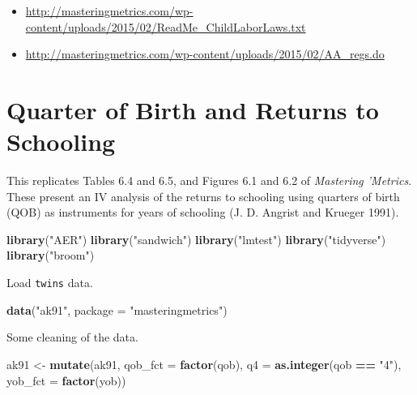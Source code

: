 \documentclass[]{book}
\newenvironment{Shaded}{\begin{snugshade}}{\end{snugshade}}
\newcommand{\KeywordTok}[1]{\textcolor[rgb]{0.13,0.29,0.53}{\textbf{#1}}}
\newcommand{\DataTypeTok}[1]{\textcolor[rgb]{0.13,0.29,0.53}{#1}}
\newcommand{\StringTok}[1]{\textcolor[rgb]{0.31,0.60,0.02}{#1}}
\newcommand{\OperatorTok}[1]{\textcolor[rgb]{0.81,0.36,0.00}{\textbf{#1}}}
\newcommand{\NormalTok}[1]{#1}
\providecommand{\tightlist}{%
  \setlength{\itemsep}{0pt}\setlength{\parskip}{0pt}}
\theoremstyle{definition}
\theoremstyle{definition}
\theoremstyle{definition}
\theoremstyle{remark}
\begin{document}
\begin{itemize}
\tightlist
\item
  \url{http://masteringmetrics.com/wp-content/uploads/2015/02/ReadMe_ChildLaborLaws.txt}
\item
  \url{http://masteringmetrics.com/wp-content/uploads/2015/02/AA_regs.do}
\end{itemize}

\chapter{Quarter of Birth and Returns to
Schooling}\label{quarter-of-birth-and-returns-to-schooling}

This replicates Tables 6.4 and 6.5, and Figures 6.1 and 6.2 of
\emph{Mastering 'Metrics}. These present an IV analysis of the returns
to schooling using quarters of birth (QOB) as instruments for years of
schooling (J. D. Angrist and Krueger 1991).

\begin{Shaded}
\begin{Highlighting}[]
\KeywordTok{library}\NormalTok{(}\StringTok{"AER"}\NormalTok{)}
\KeywordTok{library}\NormalTok{(}\StringTok{"sandwich"}\NormalTok{)}
\KeywordTok{library}\NormalTok{(}\StringTok{"lmtest"}\NormalTok{)}
\KeywordTok{library}\NormalTok{(}\StringTok{"tidyverse"}\NormalTok{)}
\KeywordTok{library}\NormalTok{(}\StringTok{"broom"}\NormalTok{)}
\end{Highlighting}
\end{Shaded}

Load \texttt{twins} data.

\begin{Shaded}
\begin{Highlighting}[]
\KeywordTok{data}\NormalTok{(}\StringTok{"ak91"}\NormalTok{, }\DataTypeTok{package =} \StringTok{"masteringmetrics"}\NormalTok{)}
\end{Highlighting}
\end{Shaded}

Some cleaning of the data.

\begin{Shaded}
\begin{Highlighting}[]
\NormalTok{ak91 <-}\StringTok{ }\KeywordTok{mutate}\NormalTok{(ak91,}
               \DataTypeTok{qob_fct =} \KeywordTok{factor}\NormalTok{(qob),}
               \DataTypeTok{q4 =} \KeywordTok{as.integer}\NormalTok{(qob }\OperatorTok{==}\StringTok{ "4"}\NormalTok{),}
               \DataTypeTok{yob_fct =} \KeywordTok{factor}\NormalTok{(yob))}
\end{Highlighting}
\end{Shaded}
\end{document}
